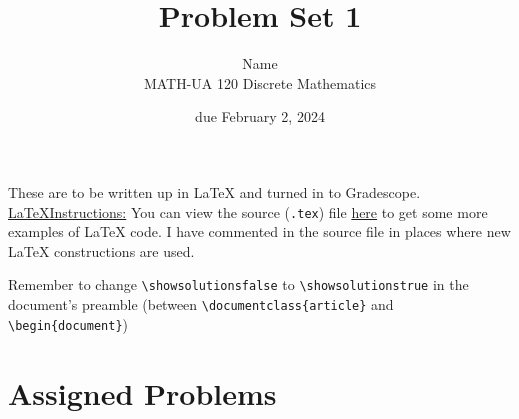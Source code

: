 \documentclass{article}
\title{Problem Set 1}
\author{%
    Name
\\  MATH-UA 120 Discrete Mathematics
}
\date{due February 2, 2024}
\newif\ifshowsolutions
\newcommand{\danger}{\marginpar[\hfill\dbend]{\dbend\hfill}}
\theoremstyle{definition}
\begin{document}
\maketitle



These are to be written up in \LaTeX{} and turned in to Gradescope.\\



\ifshowsolutions
    \SetupExSheets{solution/print=true}
\else
    \danger
 \underline{ \LaTeX  Instructions:}  You can view the source (\texttt{.tex}) file \href{https://bit.ly/4b8ddj8}{here} to get some more examples of \LaTeX{} code.  I have commented in the source file in places where new \LaTeX{} constructions are used.
  
  Remember to change \verb|\showsolutionsfalse| to \verb|\showsolutionstrue|
    in the document's preamble 
    (between \verb|\documentclass{article}| and \verb|\begin{document}|)
\fi

\section*{Assigned Problems}
\end{document}
